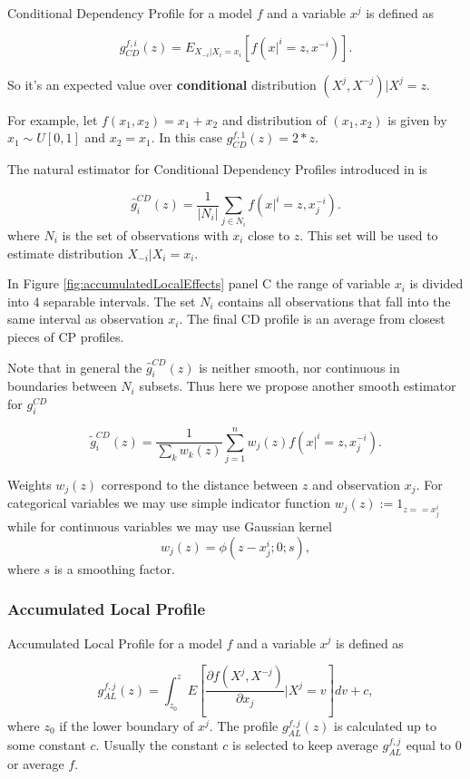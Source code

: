 \documentclass[12pt,]{krantz}
\begin{document}
Conditional Dependency Profile for a model \(f\) and a variable \(x^j\) is defined as

\[
g_{CD}^{f, i}(z) = E_{X_{-i}|X_i=x_i}[ f(x|^i = z, x^{-i}) ].
\]

So it's an expected value over \textbf{conditional} distribution \((X^j,X^{-j})|X^j=z\).

For example, let \(f(x_1, x_2) = x_1 + x_2\) and distribution of \((x_1, x_2)\) is given by \(x_1 \sim U[0,1]\) and \(x_2=x_1\). In this case \(g_{CD}^{f, 1}(z) = 2*z\).

The natural estimator for Conditional Dependency Profiles introduced in \citep{ALEPlotRPackage} is

\[
\hat g^{CD}_i(z) = \frac{1}{|N_i|} \sum_{j\in N_i} f(x|^i = z, x_j^{-i}). 
\]
where \(N_i\) is the set of observations with \(x_i\) close to \(z\). This set will be used to estimate distribution \(X_{-i}|X_i=x_i\).

In Figure \ref{fig:accumulatedLocalEffects} panel C the range of variable \(x_i\) is divided into 4 separable intervals. The set \(N_i\) contains all observations that fall into the same interval as observation \(x_i\). The final CD profile is an average from closest pieces of CP profiles.

Note that in general the \(\hat g^{CD}_i(z)\) is neither smooth, nor continuous in boundaries between \(N_i\) subsets. Thus here we propose another smooth estimator for \(g_i^{CD}\)

\[
\tilde g^{CD}_i(z) = \frac{1}{\sum_k w_{k}(z)} \sum_{j = 1}^n w_j(z) f(x|^i = z, x_j^{-i}). 
\]

Weights \(w_j(z)\) correspond to the distance between \(z\) and observation \(x_j\). For categorical variables we may use simple indicator function \(w_j(z) := 1_{z == x^i_j}\) while for continuous variables we may use Gaussian kernel
\[
w_j(z) = \phi(z - x_j^i; 0; s),
\]
where \(s\) is a smoothing factor.

\hypertarget{accumulated-local-profile}{%
\subsubsection{Accumulated Local Profile}\label{accumulated-local-profile}}

Accumulated Local Profile for a model \(f\) and a variable \(x^j\) is defined as

\[
g_{AL}^{f, j}(z) = \int_{z_0}^z E\left[\frac{\partial f(X^j, X^{-j})}{\partial x_j}|X^j = v\right] dv + c,
\]
where \(z_0\) if the lower boundary of \(x^j\). The profile \(g_{AL}^{f, j}(z)\) is calculated up to some constant \(c\). Usually the constant \(c\) is selected to keep average \(g_{AL}^{f, j}\) equal to 0 or average \(f\).
\end{document}
